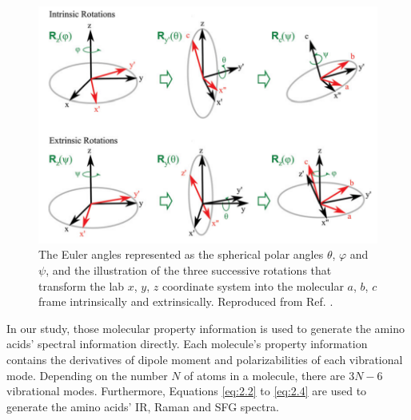 \begin{figure}[!ht] 
\centering
\includegraphics[scale=0.5]{Figures/Euler_angles_represented_as_the_spherical_polar_angles.png} 
\caption{The Euler angles represented as the spherical polar angles $\theta$, $\varphi$ and $\psi$, and the illustration of the three successive rotations that transform the lab $x$, $y$, $z$ coordinate system into the molecular $a$, $b$, $c$ frame intrinsically and extrinsically. Reproduced from Ref. . }
\label{fig:2.1}
\end{figure}

In our study, those molecular property information is used to generate the amino acids' spectral information directly. Each molecule's property information contains the derivatives of dipole moment and polarizabilities of each vibrational mode. Depending on the number $N$ of atoms in a molecule, there are $3N-6$ vibrational modes. Furthermore, Equations \ref{eq:2.2} to \ref{eq:2.4} are used to generate the amino acids' IR, Raman and SFG spectra. \\

